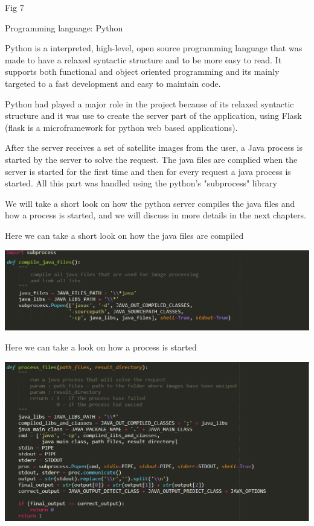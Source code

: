 \documentclass[12pt, a4paper]{report}
\begin{document}
 
\begin{center}
Fig 7
\end{center}
\par 


{\Large Programming language: Python\par}
\medskip

Python is a interpreted, high-level, open source programming language that was made to have a  relaxed syntactic structure and to be more easy to read. It supports both functional and object oriented programming and its mainly targeted to a fast development and easy to maintain code.
\par

Python had played a major role in the project because of its relaxed syntactic structure and it was use to create the server part of the application, using Flask (flask is a microframework for python web based applications).
\par 

After the server receives a set of satellite images from the user, a Java process is started by the server to solve the request. The java files are complied when the server is started for the first time and then for every request a java process is started. All this part was handled using the python's "subprocess" library
\par
\medskip

We will take a short look on how the python server compiles the java files and how a process is started, and we will discuss in more details in the next chapters.
\medskip

Here we can take a short look on how the java files are compiled
\par
\medskip
\includegraphics[scale=0.6]{python_call_java_1.png}
\bigskip

Here we can take a look on how a process is started
\par
\medskip
\includegraphics[scale=0.6]{python_call_java_2.png}
\end{document}
